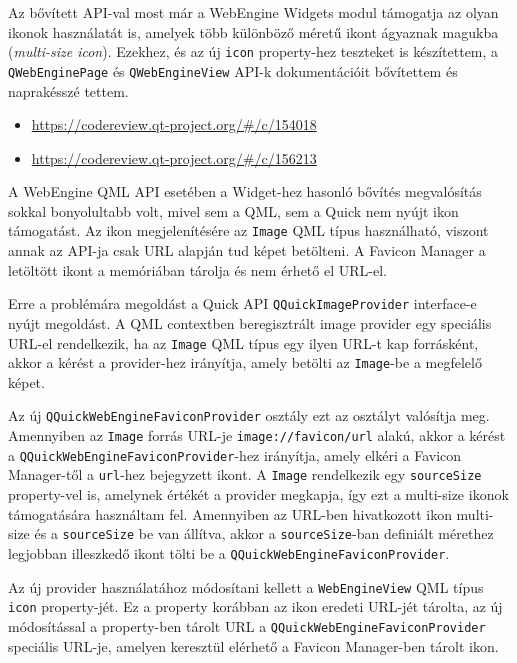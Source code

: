\documentclass[12pt]{report}
\let\origurl\url
\renewcommand{\url}[1]{%
    \textcolor{blue}{\origurl{#1}}
}
\newcommand{\gerrit}[1]{%
    \textcolor{qtgreen}{\origurl{https://codereview.qt-project.org/\#/c/#1}}
}
\begin{document}
Az bővített API-val most már a WebEngine Widgets modul támogatja az olyan ikonok használatát
is, amelyek több különböző méretű ikont ágyaznak magukba (\textit{multi-size icon}).
Ezekhez, és az új \texttt{icon} property-hez teszteket is készítettem,
a \texttt{QWebEnginePage} és \texttt{QWebEngineView} API-k dokumentációit bővítettem és
naprakésszé tettem.

\begin{center}
    \begin{reviewbox}
        \begin{itemize}
            \renewcommand{\labelitemi}{\textcolor{qtgreen}{$\blacktriangleright$}}
            \item \gerrit{154018}
            \item \gerrit{156213}
        \end{itemize}
    \end{reviewbox}
\end{center}

A WebEngine QML API esetében a Widget-hez hasonló bővítés megvalósítás sokkal bonyolultabb
volt, mivel sem a QML, sem a Quick nem nyújt ikon támogatást. Az ikon megjelenítésére az
\texttt{Image} QML típus használható, viszont annak az API-ja csak URL alapján tud képet
betölteni. A Favicon Manager a letöltött ikont a memóriában tárolja és nem érhető el URL-el.

Erre a problémára megoldást a Quick API \texttt{QQuickImageProvider} interface-e nyújt
megoldást. A QML contextben beregisztrált image provider egy speciális URL-el rendelkezik,
ha az \texttt{Image} QML típus egy ilyen URL-t kap forrásként, akkor a kérést a provider-hez
irányítja, amely betölti az \texttt{Image}-be a megfelelő képet.

Az új \texttt{QQuickWebEngineFaviconProvider} osztály ezt az osztályt valósítja meg.
Amennyiben az \texttt{Image} forrás URL-je \texttt{image://favicon/url} alakú, akkor a
kérést a \texttt{QQuickWebEngineFaviconProvider}-hez irányítja, amely elkéri a
Favicon Manager-től a \texttt{url}-hez bejegyzett ikont. A \texttt{Image} rendelkezik
egy \texttt{sourceSize} property-vel is, amelynek értékét a provider megkapja, így ezt a
multi-size ikonok támogatására használtam fel. Amennyiben az URL-ben hivatkozott ikon
multi-size és a \texttt{sourceSize} be van állítva, akkor a \texttt{sourceSize}-ban definiált
mérethez legjobban illeszkedő ikont tölti be a \texttt{QQuickWebEngineFaviconProvider}.

Az új provider használatához módosítani kellett a \texttt{WebEngineView} QML típus
\texttt{icon} property-jét. Ez a property korábban az ikon eredeti URL-jét tárolta,
az új módosítással a property-ben tárolt URL a \texttt{QQuickWebEngineFaviconProvider}
speciális URL-je, amelyen keresztül elérhető a Favicon Manager-ben tárolt ikon.
\end{document}
